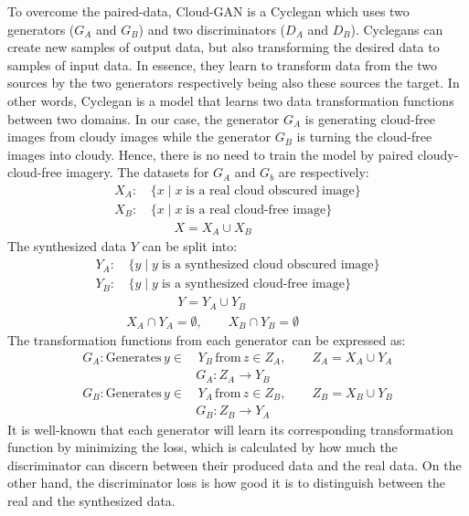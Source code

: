 \documentclass[11pt, a4paper]{article}
\begin{document}
	To overcome the paired-data, Cloud-GAN \cite{cloud-gan} is a Cycle\gls{gan} \cite{CycleGAN2017} which uses two generators ($G_A$ and $G_B$) and two discriminators ($D_A$ and $D_B$). Cycle\gls{gan}s can create new samples of output data, but also transforming the desired data to samples of input data. In essence, they learn to transform data from the two sources by the two generators respectively being also these sources the target. In other words, Cycle\gls{gan} is a model that learns two data transformation functions between two domains. In our case, the generator $G_A$ is generating cloud-free images from cloudy images while the generator $G_B$ is turning the cloud-free images into cloudy. Hence, there is no need to train the model by paired cloudy-cloud-free imagery. The datasets for $G_A$ and $G_b$ are respectively:
	\begin{align*}
		X_A:& \, \{ x \mid x \; \text{is a real cloud obscured image}\}\\
		X_B:& \, \{ x \mid x \; \text{is a real cloud-free image}\}\\
		& \qquad X = X_A \cup X_B
	\end{align*}
	The synthesized data $Y$ can be split into:
	\begin{align*}
		Y_A:& \, \{y \mid y \; \text{is a synthesized cloud obscured image}\}\\
		Y_B:& \, \{y \mid y \; \text{is a synthesized cloud-free image}\}\\
		& \qquad \qquad Y = Y_A \cup Y_B\\
		& 		X_A \cap Y_A = \emptyset, \qquad  X_B \cap Y_B = \emptyset 
	\end{align*}
	The transformation functions from each generator can be expressed as:
	\begin{align*}
		G_A: \text{Generates} \, y \in& \, Y_B \, \text{from} \, z \in Z_A, \qquad Z_A = X_A \cup Y_A\\
		&G_A : Z_A \longrightarrow Y_B\\
		G_B: \text{Generates} \, y \in& \, Y_A \, \text{from} \, z \in Z_B, \qquad Z_B = X_B \cup Y_B\\
		&G_B : Z_B \longrightarrow Y_A
	\end{align*}
	It is well-known that each generator will learn its corresponding transformation function by minimizing the loss, which is calculated by how much the discriminator can discern between their produced data and the real data. On the other hand, the discriminator loss is how good it is to distinguish between the real and the synthesized data.
\end{document}

